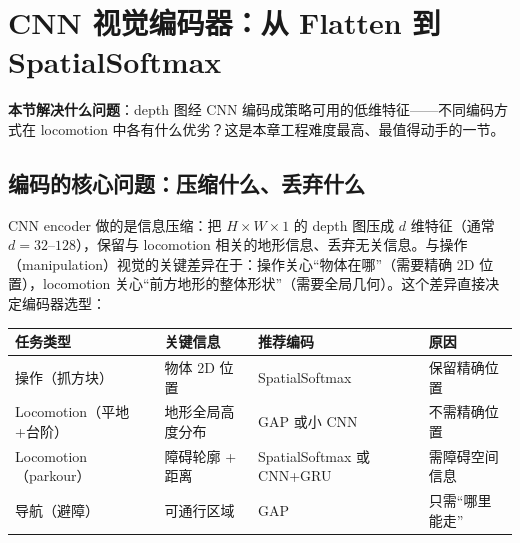 \begin{practice}[把预处理跑成可对照的数字]
\end{practice}

\section{CNN 视觉编码器：从 Flatten 到 SpatialSoftmax}
\label{sec:rlmc-vm-encoder}

\textbf{本节解决什么问题}：depth 图经 CNN 编码成策略可用的低维特征——不同编码方式在 locomotion 中各有什么优劣？这是本章工程难度最高、最值得动手的一节。

\subsection{编码的核心问题：压缩什么、丢弃什么}
\label{sec:rlmc-vm-encode-core}

CNN encoder 做的是信息压缩：把 $H\times W$ 的 depth 图压成 $d$ 维特征（通常 $d=32$--$128$），保留与 locomotion 相关的地形信息、丢弃无关信息。与操作（manipulation）视觉的关键差异在于：操作关心“物体在哪”（需要精确 2D 位置），locomotion 关心“前方地形的整体形状”（需要全局几何）。这个差异直接决定编码器选型：

\begin{center}
\small
\begin{tabular}{@{}llll@{}}
\toprule
任务类型 & 关键信息 & 推荐编码 & 原因 \\
\midrule
操作（抓方块） & 物体 2D 位置 & SpatialSoftmax & 保留精确位置 \\
Locomotion（平地+台阶） & 地形全局高度分布 & GAP 或小 CNN & 不需精确位置 \\
Locomotion（parkour） & 障碍轮廓 + 距离 & SpatialSoftmax 或 CNN+GRU & 需障碍空间信息 \\
导航（避障） & 可通行区域 & GAP & 只需“哪里能走” \\
\bottomrule
\end{tabular}
\end{center}

